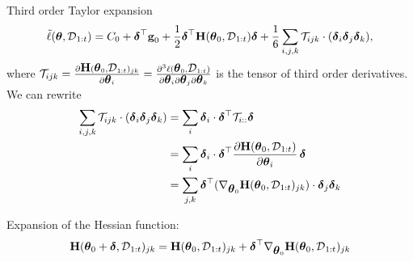 \documentclass{article} %
\newcommand{\hessian}{\vH}
\begin{document}
Third order Taylor expansion 
\begin{equation}
\label{eq:third-order-approx}
    \tilde{\loss}(\vparam, \data_{1:t}) =  C_0 + \vdelta^\top\vg_0 + \frac{1}{2}\vdelta^\top\hessian(\vparam_0, \data_{1:t})\vdelta + \frac{1}{6}\sum_{i,j,k}\mathcal{T}_{ijk}\cdot (\vdelta_i\vdelta_j\vdelta_k),
\end{equation}
where $\mathcal{T}_{ijk} = \deriv{\hessian(\vparam_0, \data_{1:t})_{jk}}{\vparam_i} = \frac{\partial^3\loss(\vparam_0, \data_{1:t})}{\partial\vparam_i \partial\vparam_j\partial\vparam_k}$ is the tensor of third order derivatives.
We can rewrite
\begin{align*}
    \sum_{i,j,k}\mathcal{T}_{ijk}\cdot (\vdelta_i\vdelta_j\vdelta_k) 
    & = \sum_i \vdelta_i \cdot \vdelta^\top \mathcal{T}_{i::}\vdelta \\
    & = \sum_i \vdelta_i \cdot \vdelta^\top \frac{\partial\hessian(\vparam_0, \data_{1:t})}{\partial\vparam_i}\,\vdelta \\
    & = \sum_{j,k} \vdelta^\top(\nabla_{\vparam_0}\hessian(\vparam_0 , \data_{1:t})_{jk})\cdot  \vdelta_j\vdelta_k
\end{align*}

Expansion of the Hessian function:
\begin{align}
    \hessian(\vparam_0 +\vdelta, \data_{1:t})_{jk} = \hessian(\vparam_0 , \data_{1:t})_{jk} + \vdelta^\top\nabla_{\vparam_0}\hessian(\vparam_0 , \data_{1:t})_{jk}
\end{align}
\end{document}
